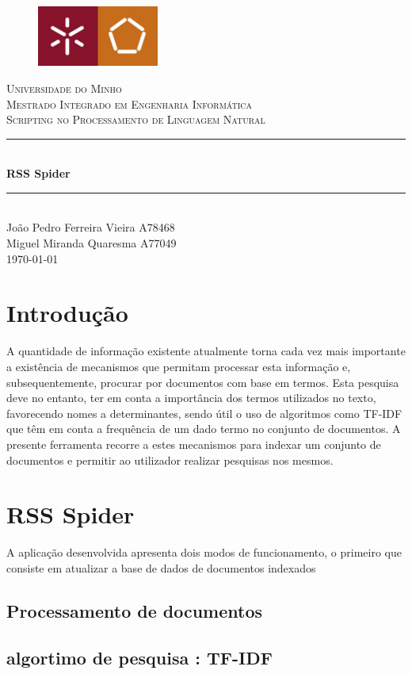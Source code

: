 \documentclass{article}
\newcommand{\titleRule}{
    \rule{\linewidth}{0.5mm} \\ [0.25cm]
}
\begin{document}
\begin{titlepage}
    \center
    \begin{figure}[H]
        \centering
        \includegraphics[width=4cm]{UM_EENG.jpg}
    \end{figure}
    \textsc{\LARGE Universidade do Minho} \\ [1.5cm]
    \textsc{\Large Mestrado Integrado em Engenharia Informática} \\ [0.5cm]
    \textsc{\large Scripting no Processamento de Linguagem Natural} \\ [0.5cm]

    \titleRule
    {\huge \bfseries RSS Spider}
    \titleRule

    João Pedro Ferreira Vieira A78468 \\
    Miguel Miranda Quaresma A77049 \\[0.25cm]

    \today
\end{titlepage}

\tableofcontents

\newpage

\section{Introdução}
A quantidade de informação existente atualmente torna cada vez mais importante a existência de mecanismos que permitam processar
esta informação e, subsequentemente, procurar por documentos com base em termos. Esta pesquisa deve no entanto, ter em conta a
importância dos termos utilizados no texto, favorecendo nomes a determinantes, sendo útil o uso de algoritmos como TF-IDF que 
têm em conta a frequência de um dado termo no conjunto de documentos. 
A presente ferramenta recorre a estes mecanismos para indexar um conjunto de documentos e permitir ao utilizador realizar pesquisas
nos mesmos.

\section{RSS Spider}
A aplicação desenvolvida apresenta dois modos de funcionamento, o primeiro que consiste em atualizar a base de dados de documentos 
indexados
\subsection{Processamento de documentos}
\subsection{algortimo de pesquisa : TF-IDF}
\end{document}
